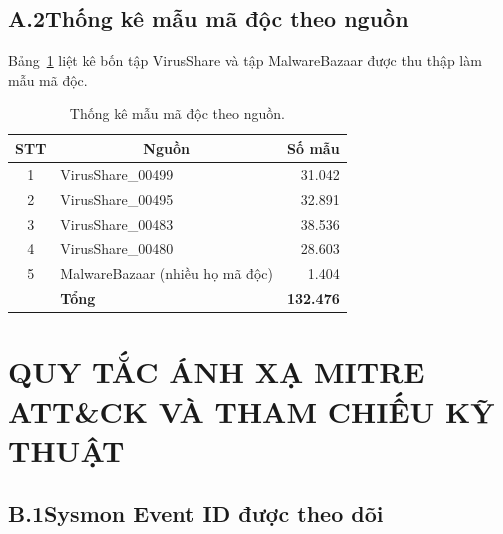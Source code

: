 \documentclass[../DoAn.tex]{subfiles}
\begin{document}
\section*{A.2\quad Thống kê mẫu mã độc theo nguồn}

Bảng~\ref{tab:malware-sources} liệt kê bốn tập VirusShare và
tập MalwareBazaar được thu thập làm mẫu mã độc.
\begin{table}[H]
\centering
\caption{Thống kê mẫu mã độc theo nguồn.}
\label{tab:malware-sources}
\begin{tabular}{|c|l|r|}
\hline
\multicolumn{1}{|c|}{\textbf{STT}} & \multicolumn{1}{c|}{\textbf{Nguồn}} & \multicolumn{1}{c|}{\textbf{Số mẫu}} \\
\hline
1 & VirusShare\_00499              & 31.042 \\
\hline
2 & VirusShare\_00495              & 32.891 \\
\hline
3 & VirusShare\_00483              & 38.536 \\
\hline
4 & VirusShare\_00480              & 28.603 \\
\hline
5 & MalwareBazaar (nhiều họ mã độc) &  1.404 \\
\hline
  & \textbf{Tổng}                  & \textbf{132.476} \\
\hline
\end{tabular}
\end{table}
\chapter{QUY TẮC ÁNH XẠ MITRE ATT\&CK VÀ THAM CHIẾU KỸ THUẬT}

\section*{B.1\quad Sysmon Event ID được theo dõi}
\end{document}
